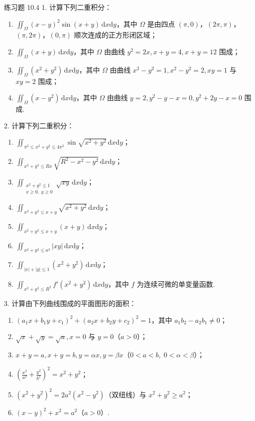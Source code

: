 \begin{exblock}{练习题 10.4}
1. 计算下列二重积分：
\begin{enumerate}
  \item $\displaystyle \iint_\Omega (x-y)^2 \sin(x+y)\,\mathrm{d}x\mathrm{d}y$，其中 $\Omega$ 是由四点 $(\pi, 0)$，$(2\pi, \pi)$，$(\pi, 2\pi)$，$(0, \pi)$ 顺次连成的正方形闭区域；
  \item $\displaystyle \iint_\Omega (x+y)\,\mathrm{d}x\mathrm{d}y$，其中 $\Omega$ 由曲线 $y^2 = 2x, x+y = 4, x+y = 12$ 围成；
  \item $\displaystyle \iint_\Omega (x^2+y^2)\,\mathrm{d}x\mathrm{d}y$，其中 $\Omega$ 由曲线 $x^2-y^2 = 1, x^2-y^2 = 2, xy = 1$ 与 $xy = 2$ 围成；
  \item $\displaystyle \iint_\Omega (x-y^2)\,\mathrm{d}x\mathrm{d}y$，其中 $\Omega$ 由曲线 $y = 2, y^2-y-x = 0, y^2+2y-x = 0$ 围成.
\end{enumerate}

2. 计算下列二重积分：
\begin{enumerate}
  \item $\displaystyle \iint_{\pi^2 \leqslant x^2+y^2 \leqslant 4\pi^2} \sin\sqrt{x^2+y^2}\,\mathrm{d}x\mathrm{d}y$；
  \item $\displaystyle \iint_{x^2+y^2 \leqslant Rx} \sqrt{R^2-x^2-y^2}\,\mathrm{d}x\mathrm{d}y$；
  \item $\displaystyle \iint_{\substack{x^2+y^2 \leqslant 1 \\ x \geqslant 0,\; y \geqslant 0}} \sqrt{xy}\,\mathrm{d}x\mathrm{d}y$；
  \item $\displaystyle \iint_{x^2+y^2 \leqslant x+y} \sqrt{x^2+y^2}\,\mathrm{d}x\mathrm{d}y$；
  \item $\displaystyle \iint_{x^2+y^2 \leqslant x+y} (x+y)\,\mathrm{d}x\mathrm{d}y$；
  \item $\displaystyle \iint_{x^2+y^2 \leqslant a^2} |xy|\,\mathrm{d}x\mathrm{d}y$；
  \item $\displaystyle \iint_{|x|+|y| \leqslant 1} (x^2+y^2)\,\mathrm{d}x\mathrm{d}y$；
  \item $\displaystyle \iint_{x^2+y^2 \leqslant R^2} f'(x^2+y^2)\,\mathrm{d}x\mathrm{d}y$，其中 $f$ 为连续可微的单变量函数.
\end{enumerate}

3. 计算由下列曲线围成的平面图形的面积：
\begin{enumerate}
  \item $(a_1 x + b_1 y + c_1)^2 + (a_2 x + b_2 y + c_2)^2 = 1$，其中 $a_1 b_2 - a_2 b_1 \neq 0$；
  \item $\sqrt{x} + \sqrt{y} = \sqrt{a}, x = 0$ 与 $y = 0$（$a > 0$）；
  \item $x+y=a, x+y=b, y=\alpha x, y=\beta x$（$0 < a < b,\; 0 < \alpha < \beta$）；
  \item $\displaystyle \left(\frac{x^2}{a^2}+\frac{y^2}{b^2}\right)^2 = x^2+y^2$；
  \item $(x^2+y^2)^2 = 2a^2(x^2-y^2)$（双纽线）与 $x^2+y^2 \geqslant a^2$；
  \item $(x-y)^2 + x^2 = a^2$（$a > 0$）.
\end{enumerate}


\end{exblock}
